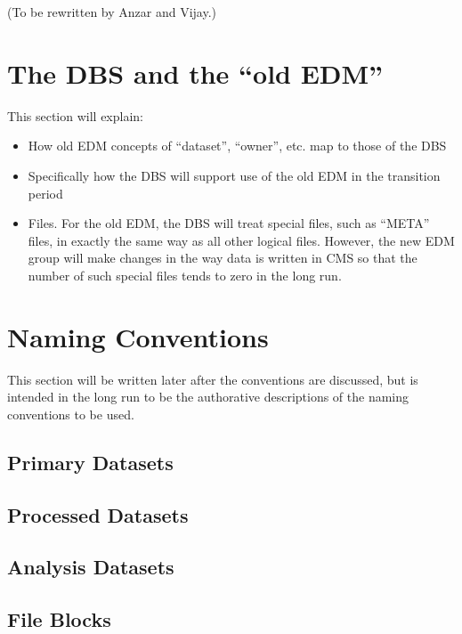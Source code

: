 \documentclass[pdftex]{cmspaper}
\begin{document}
{(To be rewritten by Anzar and Vijay.)

\section{The DBS and the ``old EDM''}

  This section will explain:

\begin{itemize}
\item How old EDM concepts of ``dataset'', ``owner'', etc. map to those
      of the DBS
\item Specifically how the DBS will support use of the old EDM in the 
      transition period 
\end{itemize}

\begin{itemize}
\item Files. For the old EDM, the DBS will treat special files, such as 
``META'' files, in exactly the same way as all other logical files. However, 
the new EDM group will make changes in the way data is written in CMS so 
that the number of such special files tends to zero in the long run.  
\end{itemize}

\section{Naming Conventions}

  This section will be written later after the conventions are discussed, but 
is intended in the long run to be the authorative descriptions of the naming
conventions to be used.
\subsection{Primary Datasets}
\subsection{Processed Datasets}
\subsection{Analysis Datasets}
\subsection{File Blocks}
}
\end{document}
